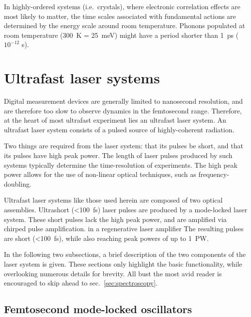 \documentclass[
  11pt,
  canadian,
  a4paper,
  open=right,
  twoside=true,
  cleardoublepage=empty,
  clearpage=empty]{scrbook}
\begin{document}
In highly-ordered systems (i.e.~crystals), where electronic correlation effects are most likely to matter, the time scales associated with fundamental actions are determined by the energy scale around room temperature. Phonons populated at room temperature (\SI{300}{\kelvin} = \SI{25}{\milli\electronvolt}) might have a period shorter than \SI{1}{\pico\second} (\(10^{-12}\) \si{\second}).

\hypertarget{sec:laser_sources}{%
\section{Ultrafast laser systems}\label{sec:laser_sources}}

Digital measurement devices are generally limited to nanosecond resolution, and are therefore too slow to observe dynamics in the femtosecond range. Therefore, at the heart of most ultrafast experiment lies an ultrafast laser system. An ultrafast laser system consists of a pulsed source of highly-coherent radiation.

Two things are required from the laser system: that its pulses be short, and that its pulses have high peak power. The length of laser pulses produced by such systems typically determine the time-resolution of experiments. The high peak power allows for the use of non-linear optical techniques, such as frequency-doubling.

Ultrafast laser systems like those used herein are composed of two optical assemblies. Ultrashort (\SI{<100}{\femto\second}) laser pulses are produced by a mode-locked laser system. These short pulses lack the high peak power, and are amplified via chirped pulse amplification. in a regenerative laser amplifier The resulting pulses are short (\SI{<100}{\femto\second}), while also reaching peak powers of up to \SI{1}{\peta\watt}.

In the following two subsections, a brief description of the two components of the laser system is given. These sections only highlight the basic functionality, while overlooking numerous details for brevity. All bust the most avid reader is encouraged to skip ahead to sec.~\ref{sec:spectroscopy}.

\hypertarget{femtosecond-mode-locked-oscillators}{%
\subsection{Femtosecond mode-locked oscillators}\label{femtosecond-mode-locked-oscillators}}
\end{document}
